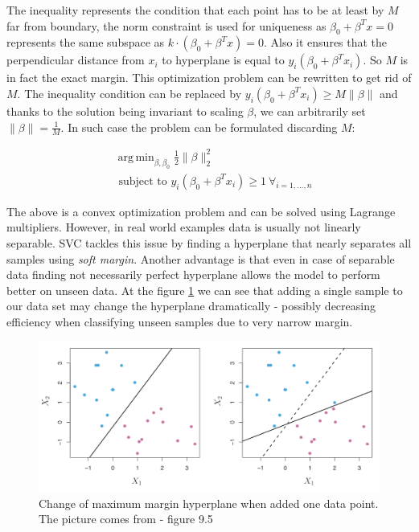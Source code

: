 \documentclass[shortabstract, english, mgr]{iithesis}
\DeclareMathOperator*{\argmin}{arg\,min}
\begin{document}
The inequality represents the condition that each point has to be at least by $M$ far from boundary, the norm constraint is used for uniqueness as $\beta_0 +\beta^Tx = 0$ represents the same subspace as $k\cdot(\beta_0 +\beta^Tx) = 0$. Also it ensures that the perpendicular distance from $x_i$ to hyperplane is equal to $y_i\left(\beta_0 + \beta^Tx_i\right)$. So $M$ is in fact the exact margin. This optimization problem can be rewritten to get rid of $M$. The inequality condition can be replaced by $y_{i}\left(\beta_{0}+\beta^T x_i\right) \geq M\|\beta\|$ and thanks to the solution being invariant to scaling $\beta$, we can arbitrarily set $\|\beta\| = \frac{1}{M}$. In such case the problem can be formulated discarding $M$:

\begin{align*}
& \argmin_{\beta, \beta_0} \frac{1}{2}\|\beta\|^2_2 \\ &{\text { subject to }} {y_{i}\left(\beta_{0}+\beta^T x_i\right) \geq 1 \ \forall_{i=1, \ldots, n}}
\end{align*}

The above is a convex optimization problem and can be solved using Lagrange multipliers. However, in real world examples data is usually not linearly separable. SVC tackles this issue by finding a hyperplane that nearly separates all samples using \textit{soft margin}. Another advantage is that even in case of separable data finding not necessarily perfect hyperplane allows the model to perform better on unseen data. At the figure \ref{fig:svc-robust} we can see that adding a single sample to our data set may change the hyperplane dramatically - possibly decreasing efficiency when classifying unseen samples due to very narrow margin. 

\begin{figure}
\centering
\includegraphics[width=\textwidth]{images/svc-robust.png}
\caption{Change of maximum margin hyperplane when added one data point. The picture comes from \cite{ISL} - figure 9.5}
\label{fig:svc-robust}
\end{figure}
\end{document}

